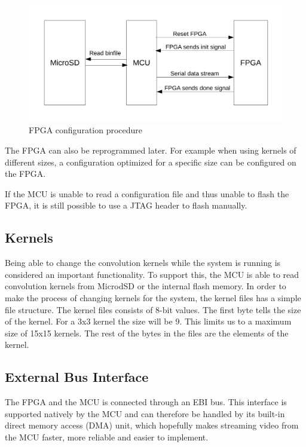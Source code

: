 \begin{figure}[h!]
    \includegraphics[width=\linewidth]{img/fpga_configuration.pdf}
    \caption{FPGA configuration procedure}
    \label{fig:fpgaConfiguration}
\end{figure}

The FPGA can also be reprogrammed later. For example when using kernels of different sizes, a configuration optimized for a specific size can be configured on the FPGA.

If the MCU is unable to read a configuration file and thus unable to flash the FPGA, it is still possible to use a JTAG header to flash manually.  

\subsection{Kernels}
Being able to change the convolution kernels while the system is running is considered an important functionality. To support this, the MCU is able to read convolution kernels from MicrodSD or the internal flash memory. 
In order to make the process of changing kernels for the system, the kernel files has a simple file structure. The kernel files consists of 8-bit values. The first byte tells the size of the kernel. For a 3x3 kernel the size will be 9. This limits us to a maximum size of 15x15 kernels. The rest of the bytes in the files are the elements of the kernel.

\subsection{External Bus Interface}
The FPGA and the MCU is connected through an EBI bus.
This interface is supported natively by the MCU and can therefore be handled by its built-in direct memory access (DMA) unit, which hopefully makes streaming video from the MCU faster, more reliable and easier to implement.

